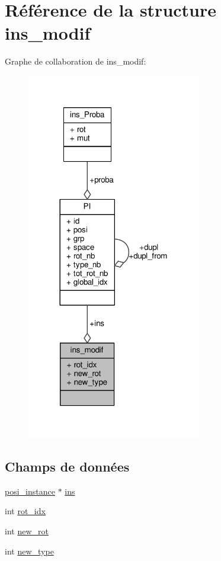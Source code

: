 \hypertarget{structins__modif}{\section{Référence de la structure ins\+\_\+modif}
\label{structins__modif}
}


Graphe de collaboration de ins\+\_\+modif\+:\nopagebreak
\begin{figure}[H]
\begin{center}
\leavevmode
\includegraphics[width=216pt]{structins__modif__coll__graph}
\end{center}
\end{figure}
\subsection*{Champs de données}
\begin{DoxyCompactItemize}
\item 
\hyperlink{read__conf_8h_ae233ac376b010d04519bd914edac5260}{posi\+\_\+instance} $\ast$ \hyperlink{structins__modif_a5689a41b8f7b378f7187fdeae3a210e0}{ins}
\item 
int \hyperlink{structins__modif_a17e374de72b7a12b94a3a944cd09f3d8}{rot\+\_\+idx}
\item 
int \hyperlink{structins__modif_a4d936fd6ef4e1615c33327618fef7024}{new\+\_\+rot}
\item 
int \hyperlink{structins__modif_a0d6761ef9ddc5ecaa75780a5944bd1b0}{new\+\_\+type}
\end{DoxyCompactItemize}


